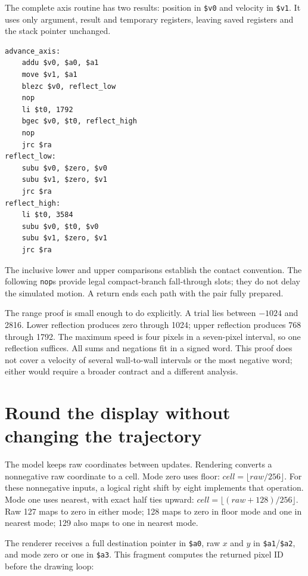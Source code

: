 The complete axis routine has two results: position in \texttt{\$v0} and velocity
in \texttt{\$v1}. It uses only argument, result and temporary registers, leaving
saved registers and the stack pointer unchanged.

\noindent\begin{minipage}{\linewidth}
  \begin{verbatim}
advance_axis:
    addu $v0, $a0, $a1
    move $v1, $a1
    blezc $v0, reflect_low
    nop
    li $t0, 1792
    bgec $v0, $t0, reflect_high
    nop
    jrc $ra
reflect_low:
    subu $v0, $zero, $v0
    subu $v1, $zero, $v1
    jrc $ra
reflect_high:
    li $t0, 3584
    subu $v0, $t0, $v0
    subu $v1, $zero, $v1
    jrc $ra
\end{verbatim}
\end{minipage}

The inclusive lower and upper comparisons establish the contact convention.
The following \texttt{nop}s provide legal compact-branch fall-through slots;
they do not delay the simulated motion. A return ends each path with the pair
fully prepared.

The range proof is small enough to do explicitly. A trial lies between $-1024$
and 2816. Lower reflection produces zero through 1024; upper reflection produces
768 through 1792. The maximum speed is four pixels in a seven-pixel interval,
so one reflection suffices. All sums and negations fit in a signed word. This
proof does not cover a velocity of several wall-to-wall intervals or the most
negative word; either would require a broader contract and a different analysis.

\section{Round the display without changing the trajectory}

The model keeps raw coordinates between updates. Rendering converts a nonnegative
raw coordinate to a cell. Mode zero uses floor: $cell=\lfloor raw/256\rfloor$.
For these nonnegative inputs, a logical right shift by eight implements that
operation. Mode one uses nearest, with exact half ties upward:
$cell=\lfloor(raw+128)/256\rfloor$. Raw 127 maps to zero in either mode;
128 maps to zero in floor mode and one in nearest mode; 129 also maps to one
in nearest mode.

The renderer receives a full destination pointer in \texttt{\$a0}, raw $x$ and
$y$ in \texttt{\$a1}/\texttt{\$a2}, and mode zero or one in \texttt{\$a3}.
This fragment computes the returned pixel ID before the drawing loop:

